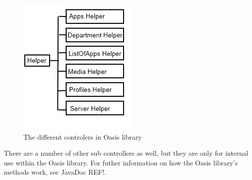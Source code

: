 \begin{figure}
	\centering
		\includegraphics[width=\textwidth]{images/controllers.png}
	\caption{The different controlers in Oasis library}
	\label{fig:controllers}
\end{figure}


There are a number of other sub controllers as well, but they are only for internal use within the Oasis library.
For futher information on how the Oasis library's methods work, see JavaDoc REF!.